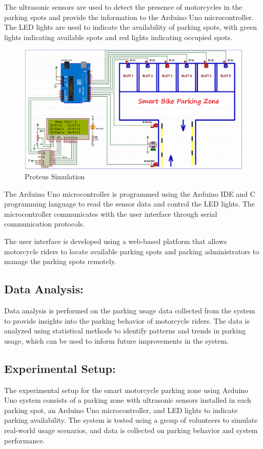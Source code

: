 \documentclass[conference]{IEEEtran}
\begin{document}
	The ultrasonic sensors are used to detect the presence of motorcycles in the parking spots and provide the information to the Arduino Uno microcontroller. The LED lights are used to indicate the availability of parking spots, with green lights indicating available spots and red lights indicating occupied spots.
			\begin{figure}[htbp]
		\centerline{\includegraphics[scale=0.25]{Proteus Simulation.png}}
		\caption{Proteus Simulation}
		\label{fig}
	\end{figure}
	
	The Arduino Uno microcontroller is programmed using the Arduino IDE and C programming language to read the sensor data and control the LED lights. The microcontroller communicates with the user interface through serial communication protocols.
	
	The user interface is developed using a web-based platform that allows motorcycle riders to locate available parking spots and parking administrators to manage the parking spots remotely.
	
	\subsection{Data Analysis:}
Data analysis is performed on the parking usage data collected from the system to provide insights into the parking behavior of motorcycle riders. The data is analyzed using statistical methods to identify patterns and trends in parking usage, which can be used to inform future improvements in the system.
	\subsection{Experimental Setup:}
	The experimental setup for the smart motorcycle parking zone using Arduino Uno system consists of a parking zone with ultrasonic sensors installed in each parking spot, an Arduino Uno microcontroller, and LED lights to indicate parking availability. The system is tested using a group of volunteers to simulate real-world usage scenarios, and data is collected on parking behavior and system performance.
	
\end{document}
